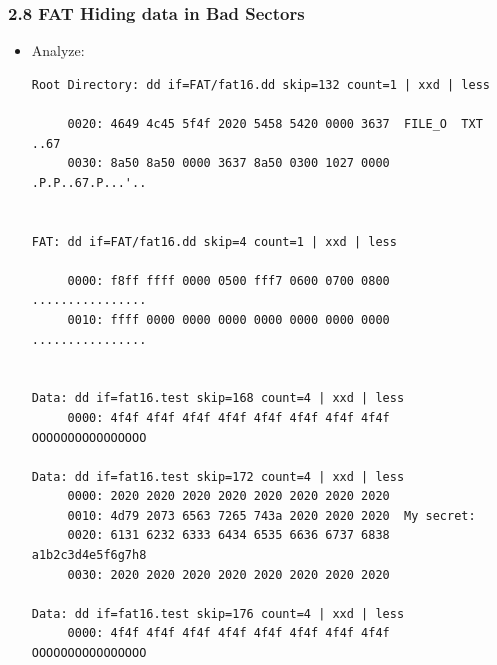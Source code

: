 \begin{frame}[fragile]
  \frametitle{2.8 FAT Hiding data in Bad Sectors}
    \begin{itemize}
	  \item Analyze:
  \begin{lstlisting}[basicstyle=\tiny]
Root Directory: dd if=FAT/fat16.dd skip=132 count=1 | xxd | less

     0020: 4649 4c45 5f4f 2020 5458 5420 0000 3637  FILE_O  TXT ..67
     0030: 8a50 8a50 0000 3637 8a50 0300 1027 0000  .P.P..67.P...'..


FAT: dd if=FAT/fat16.dd skip=4 count=1 | xxd | less

     0000: f8ff ffff 0000 0500 fff7 0600 0700 0800  ................
     0010: ffff 0000 0000 0000 0000 0000 0000 0000  ................


Data: dd if=fat16.test skip=168 count=4 | xxd | less
     0000: 4f4f 4f4f 4f4f 4f4f 4f4f 4f4f 4f4f 4f4f  OOOOOOOOOOOOOOOO

Data: dd if=fat16.test skip=172 count=4 | xxd | less
     0000: 2020 2020 2020 2020 2020 2020 2020 2020                  
     0010: 4d79 2073 6563 7265 743a 2020 2020 2020  My secret:      
     0020: 6131 6232 6333 6434 6535 6636 6737 6838  a1b2c3d4e5f6g7h8
     0030: 2020 2020 2020 2020 2020 2020 2020 2020                  
  
Data: dd if=fat16.test skip=176 count=4 | xxd | less
     0000: 4f4f 4f4f 4f4f 4f4f 4f4f 4f4f 4f4f 4f4f  OOOOOOOOOOOOOOOO
\end{lstlisting}
    \end{itemize}
\end{frame}


